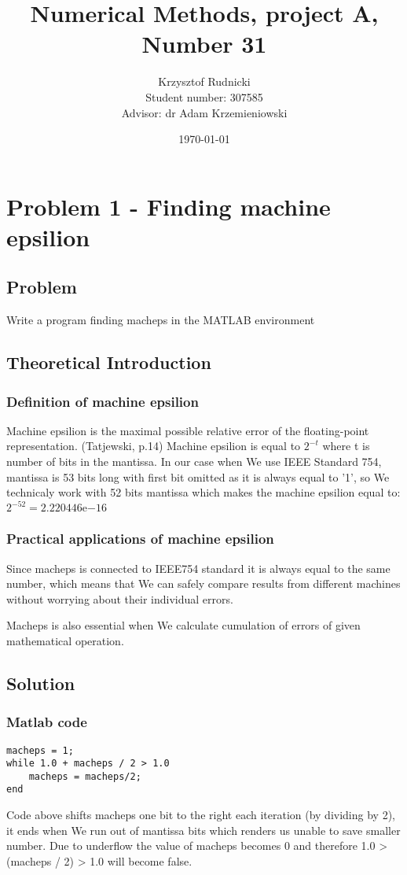 \documentclass{report}
\title{Numerical Methods, project A, Number 31}
\author{Krzysztof Rudnicki\\ Student number: 307585 \\ Advisor: dr Adam Krzemieniowski}
\date{\today}
\begin{document}
\maketitle
\tableofcontents

\chapter{Problem 1 - Finding machine epsilion}

\section{Problem}
Write a program finding macheps in the MATLAB environment
\section{Theoretical Introduction}
\subsection{Definition of machine epsilion}
Machine epsilion is the maximal possible relative error of the floating-point representation. (Tatjewski, p.14)
Machine epsilion is equal to $2^{-t}$ where t is number of bits in the mantissa.
In our case when We use IEEE Standard 754, mantissa is 53 bits long with first bit omitted as it is always equal to '1', so We technicaly work with 52 bits mantissa which makes the machine epsilion equal to: $2^{-52} = 2.220446\mathrm{e}{-16}$

\subsection{Practical applications of machine epsilion}
Since macheps is connected to IEEE754 standard it is always equal to the same number, which means that We can safely compare results from different machines without worrying about their individual errors.

Macheps is also essential when We calculate cumulation of errors of given mathematical operation.

\newpage
\section{Solution}

\subsection{Matlab code}
\begin{lstlisting}
macheps = 1;
while 1.0 + macheps / 2 > 1.0
    macheps = macheps/2;
end
\end{lstlisting}
Code above shifts macheps one bit to the right each iteration (by dividing by 2), it ends when We run out of mantissa bits which renders us unable to save smaller number. Due to underflow the value of macheps becomes 0 and therefore 1.0 > (macheps / 2) > 1.0 will become false.
\end{document}
